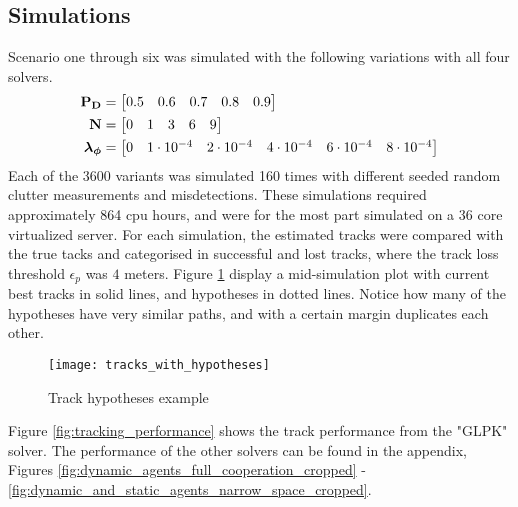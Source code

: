 \subsection{Simulations}
Scenario one through six was simulated with the following variations with all four solvers.
\begin{equation*}
\begin{split}
\boldsymbol{\mathbf{P_D}} &= \begin{bmatrix} 0.5 & 0.6 & 0.7 & 0.8 & 0.9 \end{bmatrix} \\
\boldsymbol{\mathbf{N}} &=\begin{bmatrix} 0 & 1 & 3 & 6 & 9 \end{bmatrix} \\
\boldsymbol{\mathbf{\lambda_\phi}} &=\begin{bmatrix} 0 & 1\cdot10^{-4} & 2\cdot10^{-4} & 4\cdot10^{-4} & 6\cdot10^{-4} & 8\cdot10^{-4} \end{bmatrix}
\end{split}
\end{equation*}
Each of the 3600 variants was simulated 160 times with different seeded random clutter measurements and misdetections. These simulations required approximately 864 \gls{cpu} hours, and were for the most part simulated on a 36 core virtualized server. For each simulation, the estimated tracks were compared with the true tacks and categorised in successful and lost tracks, where the track loss threshold $\epsilon_p$ was $4$ meters. Figure \ref{fig:track_hypotheses_example} display a mid-simulation plot with current best tracks in solid lines, and hypotheses in dotted lines. Notice how many of the hypotheses have very similar paths, and with a certain margin duplicates each other.
\begin{figure}[H]
    \centering
    \texttt{[image: tracks\_with\_hypotheses]}
    \caption{Track hypotheses example}
    \label{fig:track_hypotheses_example}
\end{figure}
Figure \ref{fig:tracking_performance} shows the track performance from the "GLPK" solver. The performance of the other solvers can be found in the appendix, Figures \ref{fig:dynamic_agents_full_cooperation_cropped} - \ref{fig:dynamic_and_static_agents_narrow_space_cropped}.
